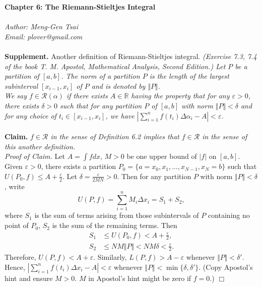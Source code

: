 \documentclass{article}
\begin{document}
\textbf{\Large Chapter 6: The Riemann-Stieltjes Integral} \\\\



\emph{Author: Meng-Gen Tsai} \\
\emph{Email: plover@gmail.com} \\\\






\textbf{Supplement.} Another definition of Riemann-Stieltjes integral.
\emph{(Exercise 7.3, 7.4 of the book
T. M. Apostol, Mathematical Analysis, Second Edition.)
Let $P$ be a partition of $[a, b]$.
The norm of a partition $P$ is the length of the largest subinterval $[x_{i-1}, x_i]$
of $P$ and is denoted by $\Vert P \Vert$.} \\

\emph{We say $f \in \mathscr{R}(\alpha)$
if there exists $A \in \mathbb{R}$ having the property that
for any $\varepsilon > 0$, there exists $\delta > 0$ such that
for any partition $P$ of $[a, b]$ with norm $\Vert P \Vert < \delta$
and for any choice of $t_i \in [x_{i-1}, x_i]$,
we have $|\sum_{i = 1}^{n} f(t_i) \Delta \alpha_i - A| < \varepsilon$.} \\\\

\textbf{Claim.}
\emph{$f \in \mathscr{R}$ in the sense of Definition 6.2
implies that
$f \in \mathscr{R}$ in the sense of this another definition.} \\

\emph{Proof of Claim.}
Let $A = \int f dx$, $M > 0$ be one upper bound of $|f|$ on $[a, b]$.
Given $\varepsilon > 0$, there exists a partition
$P_0 = \{a = x_0, x_1, \ldots, x_{N-1}, x_N = b \}$
such that
$U(P_0, f) \leq A + \frac{\varepsilon}{2}$.
Let $\delta = \frac{\varepsilon}{2MN} > 0$.
Then for any partition $P$ with norm $\Vert P \Vert < \delta$, write
$$U(P, f) = \sum_{i = 1}^{n} M_i \Delta x_i = S_1 + S_2,$$
where
$S_1$ is the sum of terms arising from those subintervals of $P$ containing no point of $P_0$,
$S_2$ is the sum of the remaining terms.
Then
\begin{align*}
S_1 &\leq U(P_0, f) < A + \frac{\varepsilon}{2}, \\
S_2 &\leq NM \Vert P \Vert < NM \delta < \frac{\varepsilon}{2}.
\end{align*}
Therefore, $U(P, f) < A + \varepsilon$.
Similarly, $L(P, f) > A - \varepsilon$ whenever $\Vert P \Vert < \delta'$.
Hence, $|\sum_{i = 1}^{n} f(t_i) \Delta x_i - A| < \varepsilon$
whenever $\Vert P \Vert < \min\{\delta, \delta'\}$.
(Copy Apostol's hint and ensure $M > 0$. $M$ in Apostol's hint might be zero if $f = 0$.)
$\Box$ \\
\end{document}
